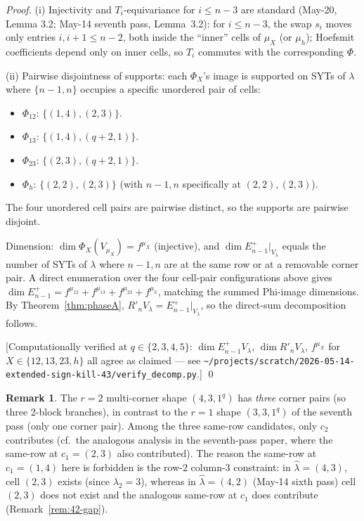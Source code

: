 \documentclass[11pt]{article}
\theoremstyle{definition}
\newtheorem{remark}[theorem]{Remark}
\newcommand{\hatl}{\widehat\lambda}
\newcommand{\Rp}{{R'}}
\begin{document}
\begin{proof}
(i) Injectivity and $T_i$-equivariance for $i \le n-3$ are standard
(May-20, Lemma 3.2; May-14 seventh pass, Lemma~3.2): for $i \le n - 3$,
the swap $s_i$ moves only entries $i, i+1 \le n-2$, both inside the
``inner'' cells of $\mu_X$ (or $\mu_h$); Hoefsmit coefficients depend
only on inner cells, so $T_i$ commutes with the corresponding $\Phi$.

(ii) Pairwise disjointness of supports: each $\Phi_X$'s image is
supported on SYTs of $\lambda$ where $\{n-1, n\}$ occupies a specific
unordered pair of cells:
\begin{itemize}[topsep=0.2em,itemsep=0.1em]
\item $\Phi_{12}$: $\{(1, 4), (2, 3)\}$.
\item $\Phi_{13}$: $\{(1, 4), (q+2, 1)\}$.
\item $\Phi_{23}$: $\{(2, 3), (q+2, 1)\}$.
\item $\Phi_h$: $\{(2, 2), (2, 3)\}$ (with $n-1, n$ specifically at
   $(2, 2), (2, 3)$).
\end{itemize}
The four unordered cell pairs are pairwise distinct, so the supports
are pairwise disjoint.

Dimension: $\dim \Phi_X(V_{\mu_X}) = f^{\mu_X}$ (injective), and
$\dim E_{n-1}^+|_{V_\lambda}$ equals the number of SYTs of $\lambda$
where $n-1, n$ are at the same row or at a removable corner pair.  A
direct enumeration over the four cell-pair configurations above gives
$\dim E_{n-1}^+ = f^{\mu_{12}} + f^{\mu_{13}} + f^{\mu_{23}} + f^{\mu_h}$,
matching the summed Phi-image dimensions.  By Theorem~\ref{thm:phaseA},
$\Rp_n V_\lambda = E_{n-1}^+|_{V_\lambda}$, so the direct-sum
decomposition follows.

[Computationally verified at $q \in \{2, 3, 4, 5\}$:
$\dim E_{n-1}^+ V_\lambda$, $\dim \Rp_n V_\lambda$, $f^{\mu_X}$ for
$X \in \{12, 13, 23, h\}$ all agree as claimed --- see
\texttt{\textasciitilde/projects/scratch/2026-05-14-extended-sign-kill-43/verify\_decomp.py}.]
\qed
\end{proof}

\begin{remark}\label{rem:r2-shape}
The $r = 2$ multi-corner shape $(4, 3, 1^q)$ has \emph{three} corner
pairs (so three 2-block branches), in contrast to the $r = 1$ shape
$(3, 3, 1^q)$ of the seventh pass (only one corner pair).  Among the
three same-row candidates, only $c_2$ contributes (cf.\ the analogous
analysis in the seventh-pass paper, where the same-row at $c_1 = (2,3)$
also contributed).  The reason the same-row at $c_1 = (1, 4)$ here is
forbidden is the row-$2$ column-$3$ constraint: in $\hatl = (4, 3)$,
cell $(2, 3)$ exists (since $\lambda_2 = 3$), whereas in $\hatl = (4, 2)$
(May-14 sixth pass) cell $(2, 3)$ does not exist and the analogous
same-row at $c_1$ does contribute (Remark~\ref{rem:42-gap}).
\end{remark}
\end{document}

